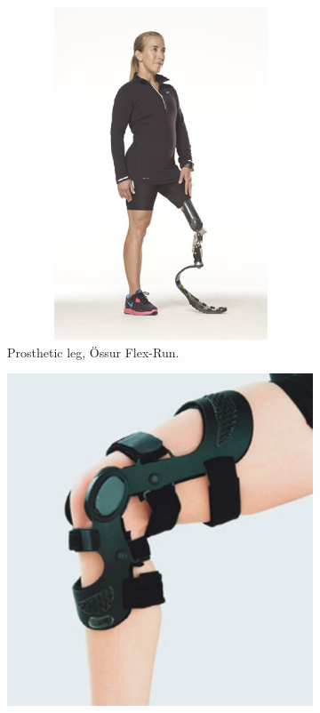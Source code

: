 \begin{figure}[htb]
	\centering
    \begin{subfigure}[b]{0.3\textwidth}
        \includegraphics[width=\textwidth]{figures/prosthetic_leg.pdf}
        \caption{Prosthetic leg, Össur Flex-Run.}
        \label{fig:prosthetic_leg}
    \end{subfigure}
    \centering
    \begin{subfigure}[b]{0.3\textwidth}
        \includegraphics[width=\textwidth]{figures/orthotic_leg.pdf}

\end{subfigure}
\end{figure}
